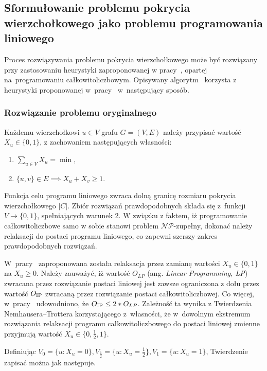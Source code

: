 \subsection{Sformułowanie problemu pokrycia wierzchołkowego jako problemu programowania liniowego}\label{section_kernelization_lp_formulation}

Proces rozwiązywania problemu pokrycia wierzchołkowego może być rozwiązany
przy zastosowaniu heurystyki zaproponowanej w pracy~\cite{hochbaum82}, opartej 
na~programowaniu całkowitoliczbowym.
Opisywany algorytm~\cite[rozdz.~4.2.2]{abukhzam03} korzysta z~ heurystyki proponowanej w~pracy~\cite{hochbaum82} 
w~następujący sposób.

\subsubsection{\textbf{Rozwiązanie problemu oryginalnego}}\label{ss_lp_original}
Każdemu wierzchołkowi $u \in V$ grafu $G=(V,E)$ należy przypisać wartość $X_u
\in \{0, 1\}$, z zachowaniem następujących własności:
\begin{enumerate}
  \item $\sum_{u \in V}X_u = \min$,
  \item $\{u,v\} \in E \implies X_u + X_v \geq 1$.
\end{enumerate}

Funkcja celu programu liniowego zwraca dolną granicę rozmiaru pokrycia wierzchołkowego $|C|$.
Zbiór rozwiązań prawdopodobnych składa się z~funkcji $V \to \{0, 1\}$,
spełniających warunek 2.
W związku z faktem, iż programowanie całkowitoliczbowe samo w sobie stanowi
problem $\mathcal{NP}$-zupełny, dokonać należy relaksacji do postaci programu liniowego, co
zapewni szerszy zakres prawdopodobnych rozwiązań.

W~pracy~\cite{khuller02} zaproponowana została relaksacja przez zamianę wartości 
$X_u \in \{0,1\}$ na $X_u \geq 0$.
Należy zauważyć, iż wartość $O_{LP}$ (ang. \emph{Linear Programming, LP}) zwracana przez rozwiązanie postaci 
liniowej jest zawsze ograniczona z dołu przez wartość $O_{\textnormal{IP}}$ zwracaną przez 
rozwiązanie postaci całkowitoliczbowej.
Co więcej, w~pracy~\cite{khuller02} udowodniono, że $O_{\textnormal{IP}} \leq 2*O_{LP}$.
Zależność ta wynika z Twierdzenia Nemhausera--Trottera korzystającego
z~własności, że w~dowolnym ekstremum rozwiązania relaksacji programu
całkowitoliczbowego do postaci liniowej zmienne przyjmują wartość 
$X_u \in \{0, \frac{1}{2}, 1\}$.

Definiując $V_0 = \{u : X_u=0\}, V_{\frac{1}{2}}=\{u: X_u=\frac{1}{2}\},
V_1=\{u: X_u=1\}$, Twierdzenie zapisać można jak następuje.

